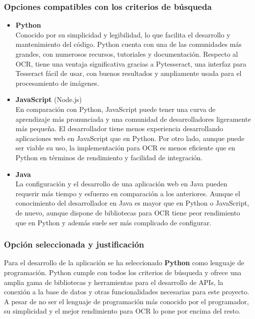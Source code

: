 \subsubsection{Opciones compatibles con los criterios de búsqueda}
\begin{itemize}
    \item \textbf{Python}\\
        Conocido por su simplicidad y legibilidad, lo que facilita el desarrollo y mantenimiento del código. Python cuenta con una de las comunidades más grandes, con numerosos recursos, tutoriales y documentación. Respecto al OCR, tiene una ventaja significativa gracias a Pytesseract, una interfaz para Tesseract fácil de usar, con buenos resultados y ampliamente usada para el procesamiento de imágenes. 
    \item \textbf{JavaScript} (Node.js)\\
        En comparación con Python, JavaScript puede tener una curva de aprendizaje más pronunciada y una comunidad de desarrolladores ligeramente más pequeña. El desarrollador tiene menos experiencia desarrollando aplicaciones web en JavaScript que en Python. Por otro lado, aunque puede ser viable su uso, la implementación para OCR es menos eficiente que en Python en términos de rendimiento y facilidad de integración.
    \item \textbf{Java}\\
        La configuración y el desarrollo de una aplicación web en Java pueden requerir más tiempo y esfuerzo en comparación a los anteriores. Aunque el conocimiento del desarrollador en Java es mayor que en Python o JavaScript, de nuevo, aunque dispone de bibliotecas para OCR tiene peor rendimiento que en Python y además suele ser más complicado de configurar.
\end{itemize}

\subsubsection{Opción seleccionada y justificación}
Para el desarrollo de la aplicación se ha seleccionado \textbf{Python} como lenguaje de programación. Python cumple con todos los criterios de búsqueda y ofrece una amplia gama de bibliotecas y herramientas para el desarrollo de APIs, la conexión a la base de datos y otras funcionalidades necesarias para este proyecto. A pesar de no ser el lenguaje de programación más conocido por el programador, su simplicidad y el mejor rendimiento para OCR lo pone por encima del resto\cite{python2021python}.

